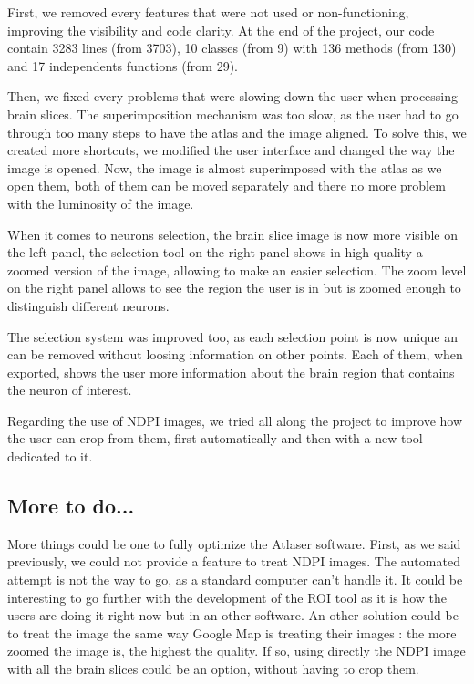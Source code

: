 \documentclass[a4paper,12pt]{report}
\begin{document}
First, we removed every features that were not used or non-functioning, improving the visibility and code clarity. At the end of the project, our code contain 3283 lines (from 3703), 10 classes (from 9) with 136 methods (from 130) and 17 independents functions (from 29).

Then, we fixed every problems that were slowing down the user when processing brain slices. The superimposition mechanism was too slow, as the user had to go through too many steps to have the atlas and the image aligned. To solve this, we created more shortcuts, we modified the user interface and changed the way the image is opened. Now, the image is almost superimposed with the atlas as we open them, both of them can be moved separately and there no more problem with the luminosity of the image.

When it comes to neurons selection, the brain slice image is now more visible on the left panel, the selection tool on the right panel shows in high quality a zoomed version of the image, allowing to make an easier selection. The zoom level on the right panel allows to see the region the user is in but is zoomed enough to distinguish different neurons.

The selection system was improved too, as each selection point is now unique an can be removed without loosing information on other points. Each of them, when exported, shows the user more information about the brain region that contains the neuron of interest.

Regarding the use of NDPI images, we tried all along the project to improve how the user can crop from them, first automatically and then with a new tool dedicated to it.\\

\subsection{More to do...}
More things could be one to fully optimize the Atlaser software. First, as we said previously, we could not provide a feature to treat NDPI images. The automated attempt is not the way to go, as a standard computer can't handle it. It could be interesting to go further with the development of the ROI tool as it is how the users are doing it right now but in an other software. An other solution could be to treat the image the same way Google Map is treating their images : the more zoomed the image is, the highest the quality. If so, using directly the NDPI image with all the brain slices could be an option, without having to crop them.
\end{document}
